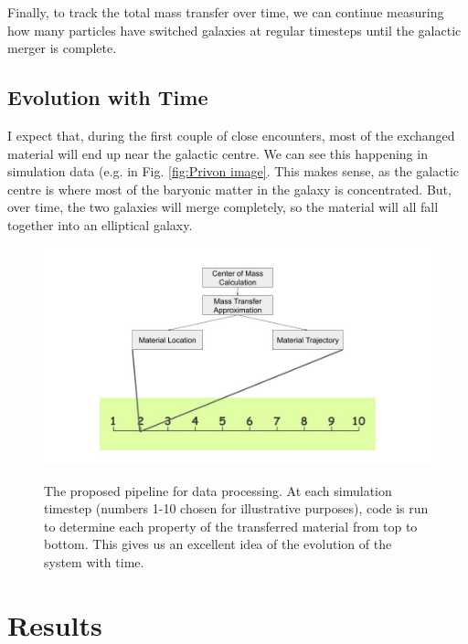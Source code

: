 \documentclass[linenumbers, ]{aastex631}
\begin{document}
Finally, to track the total mass transfer over time, we can continue measuring how many particles have switched galaxies at regular timesteps until the galactic merger is complete.

\subsection{Evolution with Time}

I expect that, during the first couple of close encounters, most of the exchanged material will end up near the galactic centre. We can see this happening in simulation data (e.g. in Fig. \ref{fig:Privon image}. This makes sense, as the galactic centre is where most of the baryonic matter in the galaxy is concentrated. But, over time, the two galaxies will merge completely, so the material will all fall together into an elliptical galaxy.

\begin{figure}
    \centering
    \includegraphics[width = \linewidth]{Untitled presentation.jpg}
    \label{fig:Untitled image}
    \caption{The proposed pipeline for data processing. At each simulation timestep (numbers 1-10 chosen for illustrative purposes), code is run to determine each property of the transferred material from top to bottom. This gives us an excellent idea of the evolution of the system with time.}
\end{figure}

\section{Results}
\end{document}
